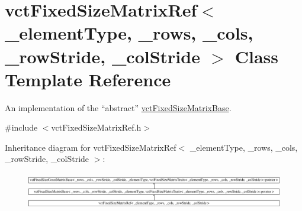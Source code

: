\hypertarget{classvct_fixed_size_matrix_ref}{\section{vct\-Fixed\-Size\-Matrix\-Ref$<$ \-\_\-element\-Type, \-\_\-rows, \-\_\-cols, \-\_\-row\-Stride, \-\_\-col\-Stride $>$ Class Template Reference}
\label{classvct_fixed_size_matrix_ref}
}


An implementation of the ``abstract'' \hyperlink{classvct_fixed_size_matrix_base}{vct\-Fixed\-Size\-Matrix\-Base}.  




{\ttfamily \#include $<$vct\-Fixed\-Size\-Matrix\-Ref.\-h$>$}

Inheritance diagram for vct\-Fixed\-Size\-Matrix\-Ref$<$ \-\_\-element\-Type, \-\_\-rows, \-\_\-cols, \-\_\-row\-Stride, \-\_\-col\-Stride $>$\-:\begin{figure}[H]
\begin{center}
\leavevmode
\includegraphics[height=1.648675cm]{d8/daa/classvct_fixed_size_matrix_ref}
\end{center}
\end{figure}
